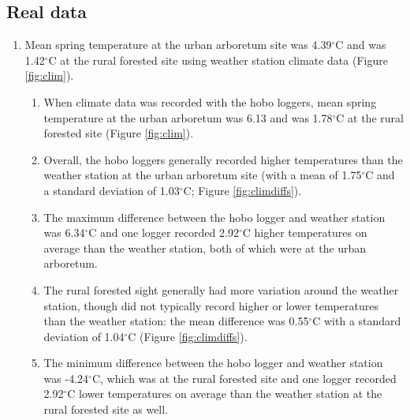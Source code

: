 \documentclass{article}\usepackage[]{graphicx}\usepackage[]{color}
\begin{document}
\subsection*{Real data}
\begin{enumerate}
\item Mean spring temperature at the urban arboretum site was 4.39$^{\circ}$C and was 1.42$^{\circ}$C at the rural forested site using weather station climate data (Figure \ref{fig:clim}). 
  \begin{enumerate}
  \item When climate data was recorded with the hobo loggers, mean spring temperature at the urban arboretum was 6.13 and was 1.78$^{\circ}$C at the rural forested site (Figure \ref{fig:clim}). 
  \item Overall, the hobo loggers generally recorded higher temperatures than the weather station at the urban arboretum site (with a mean of 1.75$^{\circ}$C and a standard deviation of 1.03$^{\circ}$C; Figure \ref{fig:climdiffs}).
  \item The maximum difference between the hobo logger and weather station was 6.34$^{\circ}$C and one logger recorded 2.92$^{\circ}$C higher temperatures on average than the weather station, both of which were at the urban arboretum. 
  \item The rural forested sight generally had more variation around the weather station, though did not typically record higher or lower temperatures than the weather station: the mean difference was 0.55$^{\circ}$C with a standard deviation of 1.04$^{\circ}$C (Figure \ref{fig:climdiffs}).
  \item The minimum difference between the hobo logger and weather station was -4.24$^{\circ}$C, which was at the rural forested site and one logger recorded 2.92$^{\circ}$C lower temperatures on average than the weather station at the rural forested site as well. 
  \end{enumerate}


\end{enumerate}
\end{document}
